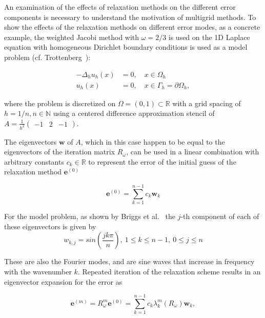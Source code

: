 An examination of the effects of relaxation methods on the different error components is necessary to understand the motivation of multigrid methods. To show the effects of the relaxation methods on different error modes, as a concrete example, the weighted Jacobi method with $\omega = 2/3$ is used on the 1D Laplace equation with homogeneous Dirichlet boundary conditions is used as a model problem (cf. Trottenberg~\cite{Trottenberg2001}):

\begin{equation}
\begin{aligned}
	-\Delta_h u_h(x) &= 0, \quad x \in \Omega_h \\
	u_h(x) &= 0, \quad x \in \Gamma_h = \partial \Omega_h,
\end{aligned}
\label{eq:model_problem}
\end{equation}

where the problem is discretized on $\Omega = (0, 1) \subset \mathbb{R}$ with a grid spacing of $h = 1/n, n \in \mathbb{N}$ using a centered difference approximation stencil of $A = \frac{1}{h^2} \begin{pmatrix} -1 & 2 &-1 \end{pmatrix}$.

The eigenvectors $\mathbf{w}$ of $A$, which in this case happen to be equal to the eigenvectors of the iteration matrix $R_{\omega}$, can be used in a linear combination with arbitrary constants $c_k \in \mathbb{R}$ to represent the error of the initial guess of the relaxation method $\mathbf{e}^{(0)}$

\begin{equation}
	\mathbf{e}^{(0)} = \sum_{k=1}^{n-1}{c_{k}\mathbf{w}_{k}}
\end{equation}

For the model problem, as shown by Briggs et al.~\cite{Briggs2000} the $j$-th component of each of these eigenvectors is given by
\begin{equation}
	w_{k,j} = sin\left(\frac{jk\pi}{n}\right),\ 1 \leq k \leq n-1,\ 0 \leq j \leq n
	\label{eq:eigenvectors}
\end{equation}

These are also the Fourier modes, and are sine waves that increase in frequency with the wavenumber $k$. Repeated iteration of the relaxation scheme results in an eigenvector expansion for the error as

\begin{equation}
	\mathbf{e}^{(m)} = R_{\omega}^m \mathbf{e}^{(0)} = \sum_{k=1}^{n-1}{c_k\lambda_k^m\left( R_{\omega}\right)\mathbf{w}_k},
\end{equation}

